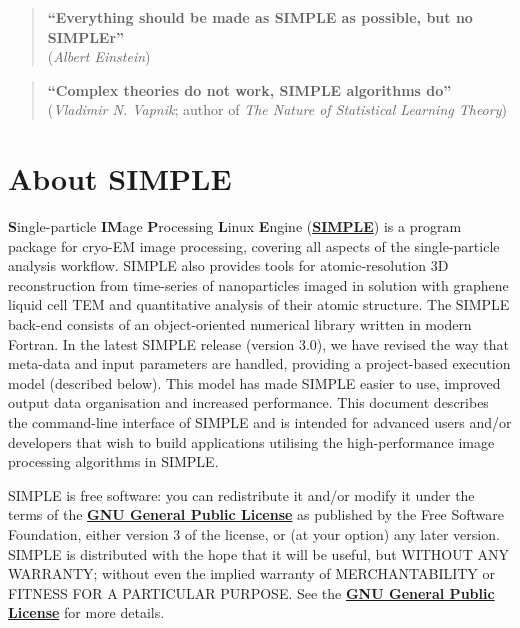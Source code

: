 \documentclass[a4paper,11pt]{article}
\begin{document}
\begin{quote}
\textbf{``Everything should be made as SIMPLE as possible, but no SIMPLEr''}\\(\textit{Albert Einstein})
\end{quote}

\begin{quote}
\textbf{``Complex theories do not work, SIMPLE algorithms do''}\\(\textit{Vladimir N. Vapnik}; author of \textit{The Nature of Statistical Learning Theory})
\end{quote}
\clearpage

\tableofcontents{}
\clearpage

\section{About SIMPLE}

\textbf{S}ingle-particle \textbf{IM}age \textbf{P}rocessing \textbf{L}inux \textbf{E}ngine (\href{www.simplecryoem.com}{\textbf{\textcolor{BurntOrange}{SIMPLE}}}) is a program package for cryo-EM image processing, covering all aspects of the single-particle analysis workflow. SIMPLE also provides tools for atomic-resolution 3D reconstruction from time-series of nanoparticles imaged in solution with graphene liquid cell TEM and quantitative analysis of their atomic structure. The SIMPLE back-end consists of an object-oriented numerical library written in modern Fortran. In the latest SIMPLE release (version 3.0), we have revised the way that meta-data and input parameters are handled, providing a project-based execution model (described below). This model has made SIMPLE easier to use, improved output data organisation and increased performance. This document describes the command-line interface of SIMPLE and is intended for advanced users and/or developers that wish to build applications utilising the high-performance image processing algorithms in SIMPLE.
 
SIMPLE is free software: you can redistribute it and/or modify it under the terms of the \href{http://www.gnu.org/copyleft/gpl.html}{\textbf{\textcolor{BurntOrange}{GNU General Public License}}} as published by the Free Software Foundation, either version 3 of the license, or (at your option) any later version. SIMPLE is distributed with the hope that it will be useful, but WITHOUT ANY WARRANTY; without even the implied warranty of MERCHANTABILITY or FITNESS FOR A PARTICULAR PURPOSE. See the \href{http://www.gnu.org/copyleft/gpl.html}{\textbf{\textcolor{BurntOrange}{GNU General Public License}}} for more details.
\end{document}
